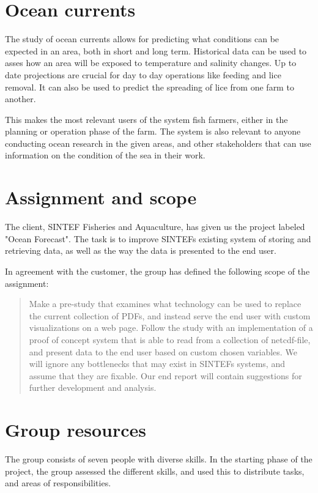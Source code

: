 \documentclass[11pt,a4paper,titlepage,oneside]{report}
\begin{document}
\section{Ocean currents}
The study of ocean currents allows for predicting what conditions can be expected in an area, both in short and long term. Historical data can be used to asses how an area will be exposed to temperature and salinity changes. Up to date projections are crucial for day to day operations like feeding and lice removal. It can also be used to predict the spreading of lice from one farm to another.

This makes the most relevant users of the system fish farmers, either in the planning or operation phase of the farm. The system is also relevant to anyone conducting ocean research in the given areas, and other stakeholders that can use information on the condition of the sea in their work.

\section{Assignment and scope}
The client, SINTEF Fisheries and Aquaculture, has given us the project labeled "Ocean Forecast". The task is to improve SINTEFs existing system of storing and retrieving data, as well as the way the data is presented to the end user. 

In agreement with the customer, the group has defined the following scope of the assignment:

\begin{quote}
Make a \gls{pre-study} that examines what technology can be used to replace the current collection of PDFs, and instead serve the end user with custom visualizations on a web page. Follow the study with an implementation of a proof of concept system that is able to read from a collection of \gls{netcdf}-file, and present data to the end user based on custom chosen variables. We will ignore any bottlenecks that may exist in SINTEFs systems, and assume that they are fixable. Our end report will contain suggestions for further development and analysis.
\end{quote}

\section{Group resources}
\label{sec:GroupResources}
The group consists of seven people with diverse skills. In the starting phase of the project, the group assessed the different skills, and used this to distribute tasks, and areas of responsibilities. 
\end{document}
